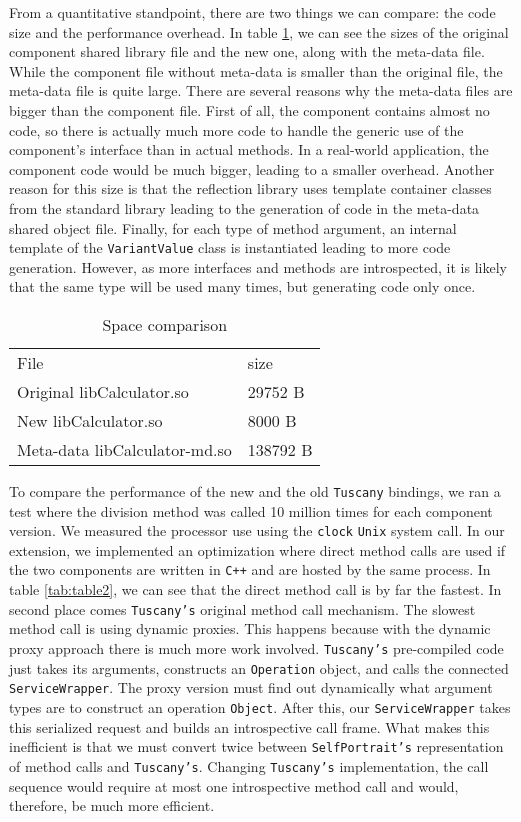 From a quantitative standpoint, there are two things we can compare: the code size and the performance overhead.
In table \ref{tab:table1}, we can see the sizes of the original component shared library file and the new one,
along with the meta-data file. While the component file without meta-data is smaller than the original file,
the meta-data file is quite large. There are several reasons why the meta-data files are bigger than the component
file. First of all, the component contains almost no code, so there is actually much more code to handle the
generic use of the component's interface than in actual methods. In a real-world application, the component code
would be much bigger, leading to a smaller overhead. Another reason for this size is that the reflection library
uses template container classes from the standard library leading to the generation of code in the meta-data shared
object file. Finally, for each type of method argument, an internal template of the \texttt{VariantValue} class
is instantiated leading to more code generation. However, as more interfaces and methods are introspected, it is
likely that the same type will be used many times, but generating code only once.

\begin{table}[!htbp]
\centering
\caption{Space comparison}
\label{tab:table1}
\begin{tabular}{ll}
\hline\noalign{\smallskip}
File & size\\
\noalign{\smallskip}
\hline
\noalign{\smallskip}
Original libCalculator.so & 29752 B\\
New libCalculator.so & 8000 B\\
Meta-data libCalculator-md.so & 138792 B\\
\hline
\end{tabular}
\end{table}

To compare the performance of the new and the old \texttt{Tuscany} bindings, we ran a test where the
division method was called 10 million times for each component version. We measured the processor use
using the \texttt{clock} \texttt{Unix} system call. In our extension, we implemented an optimization where
direct method calls are used if the two components are written in \texttt{C++} and are hosted by the same
process. In table \ref{tab:table2}, we can see that the direct method call is by far the fastest. In second
place comes \texttt{Tuscany's} original method call mechanism. The slowest method call is using dynamic proxies.
This happens because with the dynamic proxy approach there is much more work involved. \texttt{Tuscany's}
pre-compiled code just takes its arguments, constructs an \texttt{Operation} object, and calls the connected
\texttt{ServiceWrapper}. The proxy version must find out dynamically what argument types are to construct
an operation \texttt{Object}. After this, our \texttt{ServiceWrapper} takes this serialized request and
builds an introspective call frame. What makes this inefficient is that we must convert twice between \texttt{SelfPortrait's}
representation of method calls and \texttt{Tuscany's}. Changing \texttt{Tuscany's} implementation, the call sequence would
require at most one introspective method call and would, therefore, be much more efficient.

